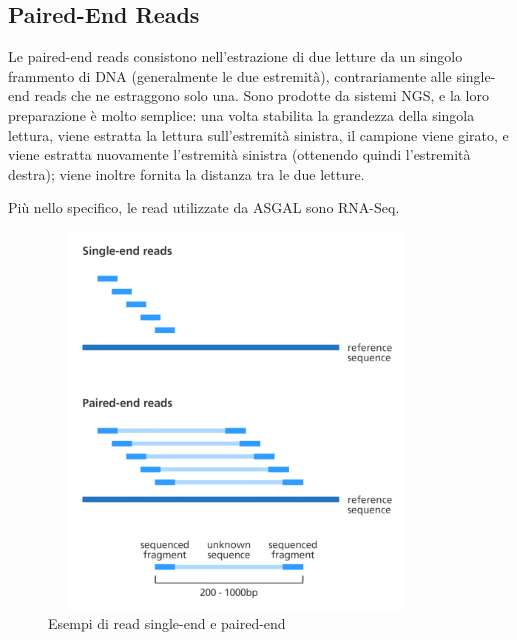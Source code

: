 \subsection{Paired-End Reads}
Le paired-end reads consistono nell'estrazione di due letture da un singolo frammento di DNA (generalmente le due estremità), contrariamente alle single-end reads che ne estraggono solo una. Sono prodotte da sistemi NGS, e la loro preparazione è molto semplice: una volta stabilita la grandezza della singola lettura, viene estratta la lettura sull'estremità sinistra, il campione viene girato, e viene estratta nuovamente l'estremità sinistra (ottenendo quindi l'estremità destra); viene inoltre fornita la distanza tra le due letture.

Più nello specifico, le read utilizzate da ASGAL sono RNA-Seq.

\begin{figure}[h!]
	\centering
	\includegraphics[height=10cm,width=10cm]{images/pairedendreads.png}
  \caption{Esempi di read single-end e paired-end}
  \label{fig:PairedEndReads}
\end{figure}